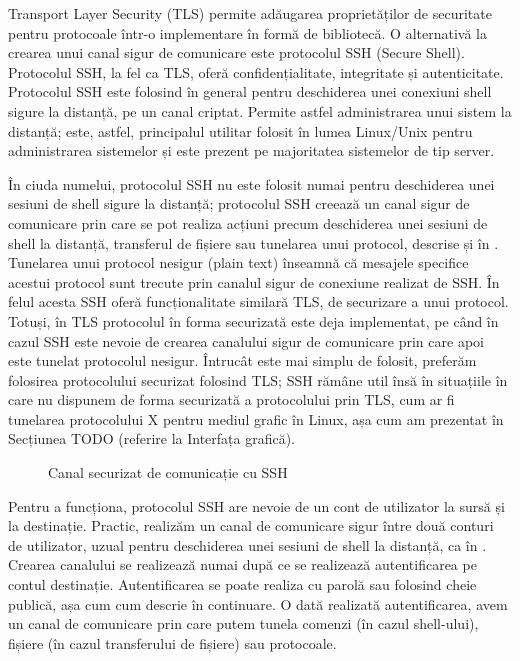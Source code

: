 Transport Layer Security (TLS) permite adăugarea proprietăților de securitate pentru protocoale într-o implementare în formă de bibliotecă. O alternativă la crearea unui canal sigur de comunicare este protocolul SSH (Secure Shell). Protocolul SSH, la fel ca TLS, oferă confidențialitate, integritate și autenticitate. Protocolul SSH este folosind în general pentru deschiderea unei conexiuni shell sigure la distanță, pe un canal criptat. Permite astfel administrarea unui sistem la distanță; este, astfel, principalul utilitar folosit în lumea Linux/Unix pentru administrarea sistemelor și este prezent pe majoritatea sistemelor de tip server.

În ciuda numelui, protocolul SSH nu este folosit numai pentru deschiderea unei sesiuni de shell sigure la distanță; protocolul SSH creează un canal sigur de comunicare prin care se pot realiza acțiuni precum deschiderea unei sesiuni de shell la distanță, transferul de fișiere sau tunelarea unui protocol, descrise și în . Tunelarea unui protocol nesigur (plain text) înseamnă că mesajele specifice acestui protocol sunt trecute prin canalul sigur de conexiune realizat de SSH. În felul acesta SSH oferă funcționalitate similară TLS, de securizare a unui protocol. Totuși, în TLS protocolul în forma securizată este deja implementat, pe când în cazul SSH este nevoie de crearea canalului sigur de comunicare prin care apoi este tunelat protocolul nesigur. Întrucât este mai simplu de folosit, preferăm folosirea protocolului securizat folosind TLS; SSH rămâne util însă în situațiile în care nu dispunem de forma securizată a protocolului prin TLS, cum ar fi tunelarea protocolului X pentru mediul grafic în Linux, așa cum am prezentat în Secțiunea TODO (referire la Interfața grafică).

\begin{figure}[htbp]
  \centering
  \def\svgwidth{\columnwidth}
  
  \caption{Canal securizat de comunicație cu SSH}
  \label{fig:sec:ssh-channel}
\end{figure}

Pentru a funcționa, protocolul SSH are nevoie de un cont de utilizator la sursă și la destinație. Practic, realizăm un canal de comunicare sigur între două conturi de utilizator, uzual pentru deschiderea unei sesiuni de shell la distanță, ca în . Crearea canalului se realizează numai după ce se realizează autentificarea pe contul destinație. Autentificarea se poate realiza cu parolă sau folosind cheie publică, așa cum cum descrie în continuare. O dată realizată autentificarea, avem un canal de comunicare prin care putem tunela comenzi (în cazul shell-ului), fișiere (în cazul transferului de fișiere) sau protocoale.

